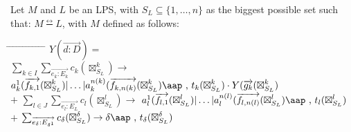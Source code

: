 \documentclass[a4paper,10pt]{article}
\theoremstyle{plain}
\theoremstyle{definition}
\newcommand{\ovr}{\overrightarrow}
\newcommand{\bisim}{\frac{\leftrightarrow}{}}
\newcommand{\tab}{\hspace*{5.mm} \= \hspace*{5.mm} \= \hspace*{5.mm} \= \hspace*{5.mm} \= \hspace*{5.mm} \= \hspace*{5.mm}  \= \hspace*{5.mm}  \= \hspace*{5.mm}  \= \hspace*{5.mm} \= \hspace*{5.mm} \= \hspace*{5.mm}  \= \hspace*{5.mm}  \= \hspace*{5.mm}\kill}
\newcommand{\at}[1]{\mbox{\aap ,} #1}
\begin{document}

\newcommand{\zi}{{\boxtimes}^k_{S_L}}
\newcommand{\zj}{{\boxtimes}^l_{S_L}}
\newcommand{\zd}{{\boxtimes}^\delta_{S_L}}


\begin{defn} \label{def:lps:M} Let $M$ and $L$ be an LPS, with $ S_L \subseteq \lbrace 1, \ldots, n \rbrace $ as the biggest possible set such that:
$M \bisim L$, with $M$ defined as follows:
\begin{tabbing}
\tab
$Y(\ovr{d:D}) = $ \\ 
\> \>$\sum_{k \in I} \sum_{\ovr{e_k:E_k}} c_k ( \zi ) \rightarrow $
$ a_k^1 (\ovr{f_{k,1}}(\zi) \vert \ldots \vert a_k^{n(k)}(\ovr{f_{k,n(k)}}(\zi) \at \text{ } t_{k}(\zi)  \cdot Y(\ovr{g_{k}}(\zi)
$ \\
\> $+ $\> $\sum_{l \in J} \sum_{\ovr{e_l:E_L}} c_l ( \zj ) \rightarrow $
$ a_{l}^1 (\ovr{f_{l,1}}(\zj) \vert \ldots \vert a_{l}^{n(l)}(\ovr{f_{l,n(l)}}(\zj) \at \text{ } t_{l}(\zj)
$ \\
\> $ + $ \> $ \sum_{\ovr{e_{\delta}:E_{\delta^1}}} c_{\delta} ( \zd ) \rightarrow 
{\delta} \at \text{ } t_{\delta}(\zd)$\\
\end{tabbing}
\end{defn}
\end{document}
